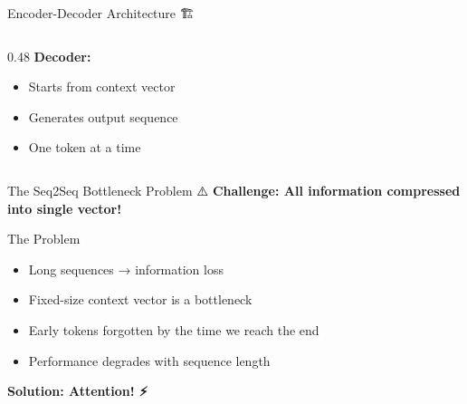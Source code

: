 \documentclass[aspectratio=169]{beamer}
\begin{document}
\begin{frame}[fragile]{Encoder-Decoder Architecture 🏗️}
\begin{columns}[T]
\begin{column}{0.48\textwidth}
\textbf{Decoder:}
\begin{itemize}\setlength{\itemsep}{0pt}
    \item Starts from context vector
    \item Generates output sequence
    \item One token at a time
\end{itemize}
\end{column}
\end{columns}
\end{frame}

\begin{frame}[shrink=5]{The Seq2Seq Bottleneck Problem ⚠️}
\textbf{Challenge: All information compressed into single vector!}

\vspace{1em}

\begin{alertblock}{The Problem}
\begin{itemize}\setlength{\itemsep}{0pt}
    \item Long sequences → information loss
    \item Fixed-size context vector is a bottleneck
    \item Early tokens forgotten by the time we reach the end
    \item Performance degrades with sequence length
\end{itemize}
\end{alertblock}

\vspace{1em}

\begin{center}
\end{center}

\vspace{1em}

\begin{center}
\LARGE
\textbf{Solution: Attention! ⚡}
\end{center}
\end{frame}
\end{document}

